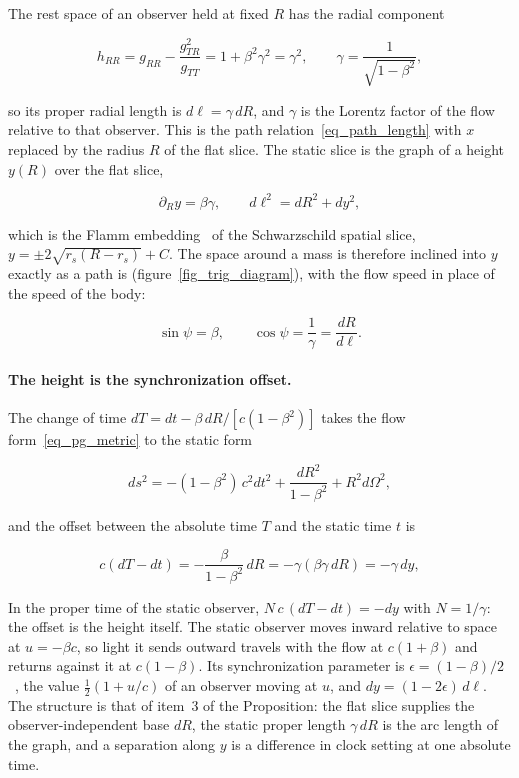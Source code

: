 \documentclass[anonymous]{iopjournal}
\begin{document}
The rest space of an observer held at fixed $R$ has the radial component

\begin{equation}\label{eq_rest_space}
    h_{RR}=g_{RR}-\frac{g_{TR}^2}{g_{TT}}=1+\beta^2\gamma^2=\gamma^2,
    \qquad
    \gamma=\frac{1}{\sqrt{1-\beta^2}},
\end{equation}

so its proper radial length is $d\ell=\gamma\,dR$, and $\gamma$ is the Lorentz factor of the flow relative to that observer. This is the path relation~\eqref{eq_path_length} with $x$ replaced by the radius $R$ of the flat slice. The static slice is the graph of a height $y(R)$ over the flat slice,

\begin{equation}\label{eq_flamm_slope}
    \partial_R y=\beta\gamma,
    \qquad
    d\ell^2=dR^2+dy^2 ,
\end{equation}

which is the Flamm embedding~\cite{Flamm1916} of the Schwarzschild spatial slice, $y=\pm2\sqrt{r_s(R-r_s)}+C$. The space around a mass is therefore inclined into $y$ exactly as a path is (figure~\ref{fig_trig_diagram}), with the flow speed in place of the speed of the body:

\begin{equation}\label{eq_flamm_angle}
    \sin\psi=\beta,
    \qquad
    \cos\psi=\frac{1}{\gamma}=\frac{dR}{d\ell}.
\end{equation}

\paragraph{The height is the synchronization offset.} The change of time $dT=dt-\beta\,dR/\left[c(1-\beta^2)\right]$ takes the flow form~\eqref{eq_pg_metric} to the static form

\begin{equation}\label{eq_static_form}
    ds^2=-(1-\beta^2)\,c^2dt^2+\frac{dR^2}{1-\beta^2}+R^2d\Omega^2 ,
\end{equation}

and the offset between the absolute time $T$ and the static time $t$ is

\begin{equation}\label{eq_sync_gap_flamm}
    c\left(dT-dt\right)=-\frac{\beta}{1-\beta^2}\,dR=-\gamma\left(\beta\gamma\,dR\right)=-\gamma\,dy ,
\end{equation}

In the proper time of the static observer, $N\,c\,(dT-dt)=-dy$ with $N=1/\gamma$: the offset is the height itself. The static observer moves inward relative to space at $u=-\beta c$, so light it sends outward travels with the flow at $c(1+\beta)$ and returns against it at $c(1-\beta)$. Its synchronization parameter is $\epsilon=(1-\beta)/2$~\cite{Reichenbach1958}, the value $\tfrac12(1+u/c)$ of an observer moving at $u$, and $dy=(1-2\epsilon)\,d\ell$. The structure is that of item~3 of the Proposition: the flat slice supplies the observer-independent base $dR$, the static proper length $\gamma\,dR$ is the arc length of the graph, and a separation along $y$ is a difference in clock setting at one absolute time.
\end{document}
